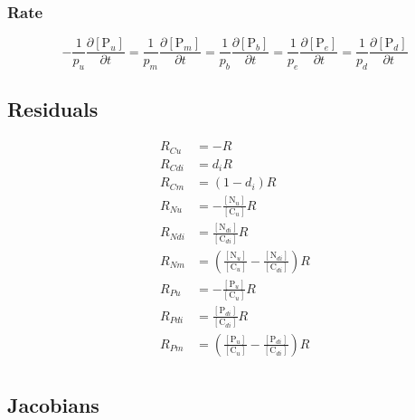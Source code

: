 \documentclass[12pt, a4paper]{article}
\begin{document}
\subsubsection{Rate}
\begin{equation}
-\frac{1}{p_u}\frac{\partial [\text{P}_u]}{\partial t} = \frac{1}{p_m}\frac{\partial [\text{P}_m]}{\partial t} = \frac{1}{p_b} \frac{\partial [\text{P}_b]}{\partial t} = \frac{1}{p_e} \frac{\partial [\text{P}_e]}{\partial t} = \frac{1}{p_d}\frac{\partial [\text{P}_d]}{\partial t}
\end{equation}

\subsection{Residuals}
\begin{align*}
R_{Cu} &=  -R \\
R_{Cdi} &=  d_i R \\
R_{Cm} &=  (1 - d_i) R \\
R_{Nu} &= -\frac{[\text{N}_u]}{[\text{C}_u]}R \\
R_{Ndi} &=  \frac{[\text{N}_{di}]}{[\text{C}_{di}]} R \\
R_{Nm} &=  \left(\frac{[\text{N}_u]}{[\text{C}_u]} - \frac{[\text{N}_{di}]}{[\text{C}_{di}]}\right) R \\
R_{Pu} &= -\frac{[\text{P}_u]}{[\text{C}_u]}R \\
R_{Pdi} &=  \frac{[\text{P}_{di}]}{[\text{C}_{di}]} R \\
R_{Pm} &=  \left(\frac{[\text{P}_u]}{[\text{C}_u]} - \frac{[\text{P}_{di}]}{[\text{C}_{di}]}\right) R \\
\end{align*}

\subsection{Jacobians}
\end{document}
